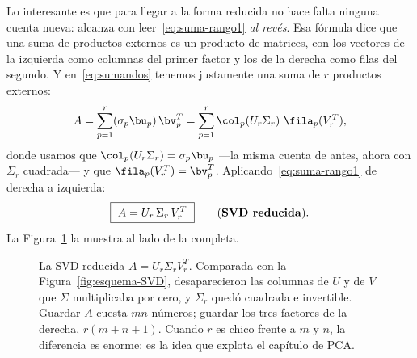 Lo interesante es que para llegar a la forma reducida no hace falta ninguna
cuenta nueva: alcanza con leer~\eqref{eq:suma-rango1} \emph{al revés}. Esa
fórmula dice que una suma de productos externos es un producto de matrices,
con los vectores de la izquierda como columnas del primer factor y los de la
derecha como filas del segundo. Y en~\eqref{eq:sumandos} tenemos justamente
una suma de $r$ productos externos:
\[
A=\sum_{p=1}^{r}(\sigma_p\bu_p)\,\bv_p^T
=\sum_{p=1}^{r}\col_p(U_r\Sigma_r)\ \fila_p(V_r^T) ,
\]
donde usamos que $\col_p(U_r\Sigma_r)=\sigma_p\bu_p$ ---la misma cuenta de
antes, ahora con $\Sigma_r$ cuadrada--- y que $\fila_p(V_r^T)=\bv_p^T$.
Aplicando~\eqref{eq:suma-rango1} de derecha a izquierda:
\[
\boxed{\ A=U_r\,\Sigma_r\,V_r^T\ }\qquad\text{(\textbf{SVD reducida}).}
\]
La Figura~\ref{fig:esquema-SVD-reducida} la muestra al lado de la completa.

\begin{figure}[htbp]
\centering
{}
\caption{La SVD reducida $A=U_r\Sigma_r V_r^T$. Comparada con la
Figura~\ref{fig:esquema-SVD}, desaparecieron las columnas de $U$ y de $V$ que
$\Sigma$ multiplicaba por cero, y $\Sigma_r$ quedó cuadrada e invertible.
Guardar $A$ cuesta $mn$ números; guardar los tres factores de la derecha,
$r(m+n+1)$. Cuando $r$ es chico frente a $m$ y $n$, la diferencia es enorme:
es la idea que explota el capítulo de PCA.}
\label{fig:esquema-SVD-reducida}
\end{figure}

